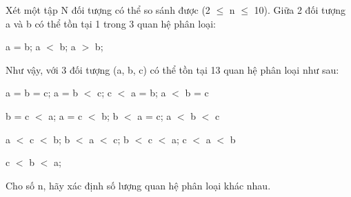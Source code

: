 Xét một tập N đối tượng có thể so sánh được (2 $\le$ n $\le$ 10). Giữa 2 đối tượng a và b có thể tồn tại 1 trong 3 quan hệ phân loại:

a = b; a $<$ b; a $>$ b;

Như vậy, với 3 đối tượng (a, b, c) có thể tồn tại 13 quan hệ phân loại như sau:

a = b = c; a = b $<$ c; c $<$ a = b; a $<$ b = c


b = c $<$ a; a = c $<$ b; b $<$ a = c; a $<$ b $<$ c


a $<$ c $<$ b; b $<$ a $<$ c; b $<$ c $<$ a; c $<$ a $<$ b


c $<$ b $<$ a;

Cho số n, hãy xác định số lượng quan hệ phân loại khác nhau.